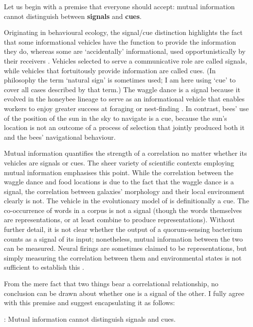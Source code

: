 \documentclass[12pt]{article}
\begin{document}
Let us begin with a premise that everyone should accept: mutual information cannot distinguish between \textbf{signals} and \textbf{cues}.

Originating in behavioural ecology, the signal/cue distinction highlights the fact that some informational vehicles have the function to provide the information they do, whereas some are `accidentally' informational, used opportunistically by their receivers \citep[$\S$1.2]{maynardsmith2003animal}.
Vehicles selected to serve a communicative role are called signals, while vehicles that fortuitously provide information are called cues.
(In philosophy the term `natural sign' is sometimes used; I am here using `cue' to cover all cases described by that term.)
The waggle dance is a signal because it evolved in the honeybee lineage to serve as an informational vehicle that enables workers to enjoy greater success at foraging or nest-finding \citep{gould1975honey,riley2005flight}.
In contrast, bees' use of the position of the sun in the sky to navigate is a cue, because the sun's location is not an outcome of a process of selection that jointly produced both it and the bees' navigational behaviour.

Mutual information quantifies the strength of a correlation no matter whether its vehicles are signals or cues.
The sheer variety of scientific contexts employing mutual information emphasises this point.
While the correlation between the waggle dance and food locations is due to the fact that the waggle dance is a signal, the correlation between galaxies' morphology and their local environment clearly is not.
The vehicle in the evolutionary model of \citet{donaldson-matasci2010fitness} is definitionally a cue.
The co-occurrence of words in a corpus is not a signal (though the words themselves are representations, or at least combine to produce representations).
Without further detail, it is not clear whether the output of a quorum-sensing bacterium counts as a signal of its input; nonetheless, mutual information between the two can be measured.
Neural firings are sometimes claimed to be representations, but simply measuring the correlation between them and environmental states is not sufficient to establish this \citep{rathkopf2017neural}.

From the mere fact that two things bear a correlational relationship, no conclusion can be drawn about whether one is a signal of the other.
I fully agree with this premise and suggest encapsulating it as follows:

\begin{myquote}
\ami: Mutual information cannot distinguish signals and cues.
\end{myquote}
\end{document}
